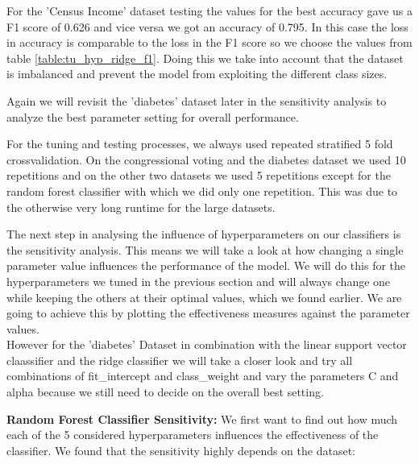 \documentclass[a4paper,10pt]{article}
\begin{document}
For the 'Census Income' dataset testing the values for the best accuracy gave us a F1 score of 0.626 and vice versa we got an accuracy of 0.795. In this case the loss in accuracy is comparable to the loss in the F1 score so we choose the values from table \ref{table:tu_hyp_ridge_f1}. Doing this we take into account that the dataset is imbalanced and prevent the model from exploiting the different class sizes.

Again we will revisit the 'diabetes' dataset later in the sensitivity analysis to analyze the best parameter setting for overall performance.


For the tuning and testing processes, we always used repeated stratified 5 fold crossvalidation. On the congressional voting and the diabetes dataset we used 10 repetitions and on the other two datasets we used 5 repetitions except for the random forest classifier with which we did only one repetition. This was due to the otherwise very long runtime for the large datasets.

The next step in analysing the influence of hyperparameters on our classifiers is the sensitivity analysis. This means we will take a look at how changing a single parameter value influences the performance of the model. We will do this for the hyperparameters we tuned in the previous section and will always change one while keeping the others at their optimal values, which we found earlier. We are going to achieve this by plotting the effectiveness measures against the parameter values.\\
However for the 'diabetes' Dataset in combination with the linear support vector claassifier and the ridge classifier we will take a closer look and try all combinations of \textsf{fit\_intercept} and \textsf{class\_weight} and vary the parameters \textsf{C} and \textsf{alpha} because we still need to decide on the overall best setting.

\textbf{Random Forest Classifier Sensitivity:}
We first want to find out how much each of the 5 considered hyperparameters influences the effectiveness of the classifier. We found that the sensitivity highly depends on the dataset:
\end{document}
